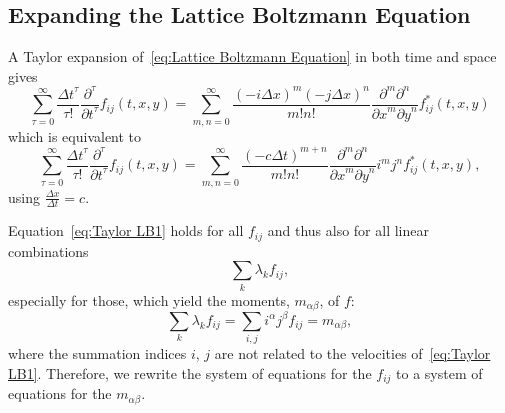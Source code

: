 
\subsection{Expanding the Lattice Boltzmann Equation}
\label{sub:Expanding the Lattice Boltzmann Equation}

A Taylor expansion of~\eqref{eq:Lattice Boltzmann Equation} in both time and space gives
\begin{equation*}
  \sum_{\tau = 0}^\infty \frac{{\Delta t}^\tau }{\tau!} \frac{\partial^\tau}{{\partial t}^\tau} f_{ij}(t, x, y) =
  \sum_{m,n = 0}^\infty \frac{{(-i\Delta x)}^m{(-j\Delta x)}^n} {m!n!} \frac{\partial^m \partial^n}{ {\partial x}^m{\partial y}^n} f^*_{ij}(t, x, y)
\end{equation*}
which is equivalent to
\begin{equation}
  \label{eq:Taylor LB1}
  \sum_{\tau = 0}^\infty \frac{{\Delta t}^\tau }{\tau!} \frac{\partial^\tau}{{\partial t}^\tau} f_{ij}(t, x, y) =
    \sum_{m,n = 0}^\infty \frac{{(-c\Delta t)}^{m+n}} {m!n!} \frac{\partial^m \partial^n}{ {\partial x}^m{\partial y}^n} i^m j^n f^*_{ij}(t, x, y),
\end{equation}
using $\frac{\Delta x} {\Delta{t}} = c$.

Equation~\eqref{eq:Taylor LB1} holds for all $f_{ij}$ and thus also for all linear combinations
\begin{equation*}
  \sum_{k}\lambda_k f_{ij},
\end{equation*}
especially for those, which yield the moments, $m_{\alpha\beta} $, of $f$:
\begin{equation*}
  \sum_{k}\lambda_k f_{ij} = \sum_{i,j}i^\alpha j^\beta f_{ij}=m_{\alpha\beta},
\end{equation*}
where the summation indices $i$, $j$ are not related to the velocities of~\eqref{eq:Taylor LB1}.
Therefore, we rewrite the system of equations for the $f_{ij}$ to a system of equations for the $m_{\alpha\beta}$.


